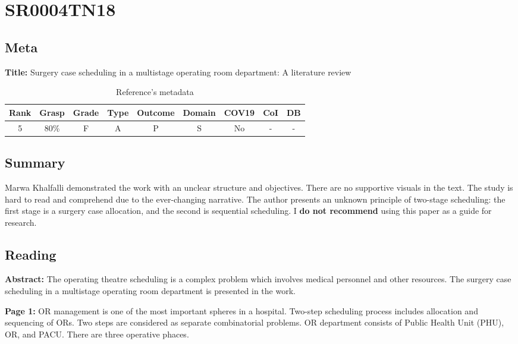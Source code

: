 \section{ SR0004TN18 }


\subsection{Meta}

    \textbf{Title:}
    Surgery case scheduling in a multistage operating room department: A literature review

    \begin{table}[H]
        \centering
        \begin{tabular}{|c|c|c|c|c|c|c|c|c|}
            \hline
                \textbf{Rank} & \textbf{Grasp} & \textbf{Grade} & \textbf{Type} & \textbf{Outcome} & \textbf{Domain} & \textbf{COV19} & \textbf{CoI} & \textbf{DB} \\
            \hline
                5 & 80\% & F & A & P & S & No & - & - \\
            \hline
        \end{tabular}
        \caption{Reference's metadata}
        \label{tab:SR0004TN18}
    \end{table}

\subsection{Summary}
    Marwa Khalfalli \cite{x104} demonstrated the work with an unclear structure and objectives. There are no supportive visuals in the text. The study is hard to read and comprehend due to the ever-changing narrative. The author presents an unknown principle of two-stage scheduling: the first stage is a surgery case allocation, and the second is sequential scheduling. I \textbf{do not recommend} using this paper as a guide for research.

\subsection{Reading}
    \textbf{Abstract:}
    The operating theatre scheduling is a complex problem which involves medical personnel and other resources. The surgery case scheduling in a multistage operating room department is presented in the work.

    \textbf{Page 1:}
    OR management is one of the most important spheres in a hospital. Two-step scheduling process includes allocation and sequencing of ORs. Two steps are considered as separate combinatorial problems. OR department consists of Public Health Unit (PHU), OR, and PACU. There are three operative phaces. 
    
